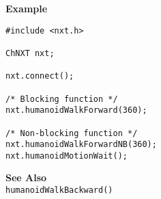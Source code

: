 \noindent
{\bf Example}
\begin{verbatim}
#include <nxt.h>

ChNXT nxt;

nxt.connect();

/* Blocking function */
nxt.humanoidWalkForward(360);

/* Non-blocking function */
nxt.humanoidWalkForwardNB(360);
nxt.humanoidMotionWait();
\end{verbatim}

\noindent
{\bf See Also}\\
\texttt{humanoidWalkBackward()}

